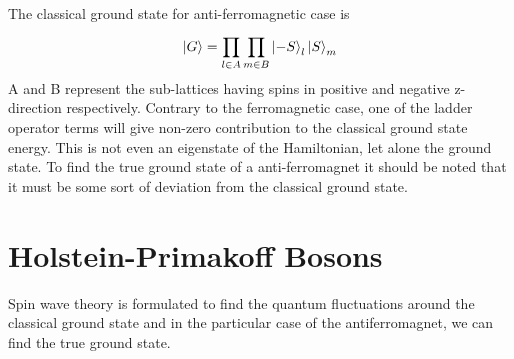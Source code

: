 The classical ground state for anti-ferromagnetic case is 
\begin{equation}
	\ket{G} = \prod_{l\in A}^{}\prod_{m \in B}^{}\ket{-S}_l\ket{S}_m
\end{equation}
A and B represent the sub-lattices having spins in positive and negative z-direction respectively. Contrary to the ferromagnetic case, one of the ladder operator terms will give non-zero contribution to the classical ground state energy. This is not even an eigenstate of the Hamiltonian, let alone the ground state. To find the true ground state of a anti-ferromagnet it should be noted that it must be some sort of deviation from the classical ground state.

\section{Holstein-Primakoff Bosons}

Spin wave theory is formulated to find the quantum fluctuations around the classical ground state and in the particular case of the antiferromagnet, we can find the true ground state. 

